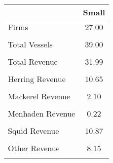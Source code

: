 \begin{tabular}{l*{1}{c}}
\hline\hline
                &    Small\\
\hline
Firms           &    27.00\\
                &         \\
Total Vessels   &    39.00\\
                &         \\
Total Revenue   &    31.99\\
                &         \\
Herring Revenue &    10.65\\
                &         \\
Mackerel Revenue&     2.10\\
                &         \\
Menhaden Revenue&     0.22\\
                &         \\
Squid Revenue   &    10.87\\
                &         \\
Other Revenue   &     8.15\\
                &         \\
\hline\hline
\end{tabular}
